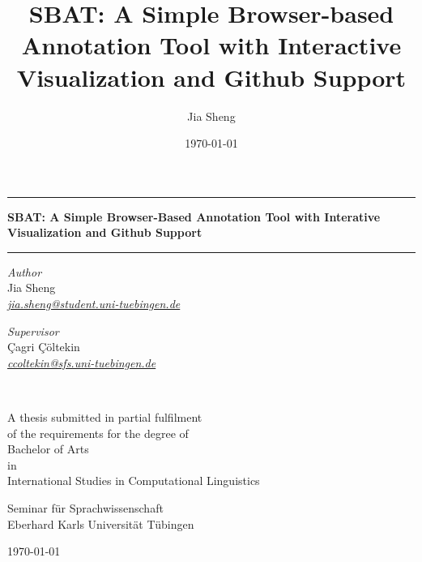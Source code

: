 \documentclass[12ptm a4paper]{article}
\title{SBAT: A Simple Browser-based Annotation Tool with Interactive Visualization and Github Support}
\author{Jia Sheng}
\date{\today}
\begin{document}
\begin{titlepage}
\begin{center}

\hrule
\vspace{0.6cm}
{\bfseries\LARGE
SBAT: A Simple Browser-Based Annotation Tool with Interative Visualization and Github Support
}\\[1cm]
\hrule
\vspace*{.05\textheight}
 
\begin{minipage}[t]{0.49\textwidth}
\begin{flushleft}
{\large
\textit{Author}\\
Jia Sheng}\\
\href{mailto:jia.sheng@student.uni-tuebingen.de}{\textit{jia.sheng@student.uni-tuebingen.de}}\\
\end{flushleft}
\end{minipage}
\begin{minipage}[t]{0.49\textwidth}
\begin{flushright}
{\large
\textit{Supervisor}\\
Çagri Çöltekin}\\
\href{mailto:ccoltekin@sfs.uni-tuebingen.de}{\textit{ccoltekin@sfs.uni-tuebingen.de}}\\
\end{flushright}
\end{minipage}\\

\vfill

A thesis submitted in partial fulfilment\\
of the requirements for the degree of\\[2mm]
{\large Bachelor of Arts}\\
in\\[1mm]
{\large International Studies in Computational Linguistics}

\vspace*{.1\textheight}

{\large Seminar für Sprachwissenschaft\\
Eberhard Karls Universität Tübingen

\vspace{1em}
\today}
\end{center}
\end{titlepage}

\end{document}
